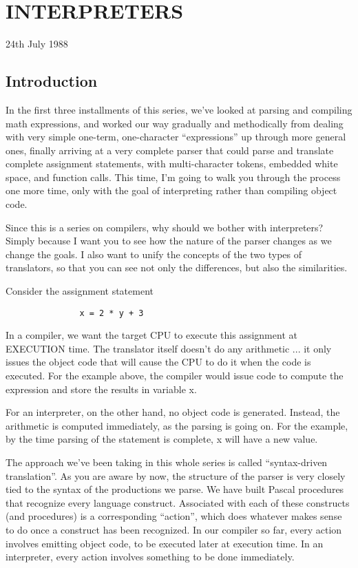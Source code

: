 
\chapter{INTERPRETERS}

24th July 1988

\section{Introduction}

In the first three installments of this series, we've  looked at parsing and  compiling math expressions, and worked our way gradually and methodically from dealing  with  very  simple one-term, one-character ``expressions'' up through more general ones, finally arriving at a very complete parser that could parse and translate complete  assignment  statements, with  multi-character  tokens, embedded white space, and function calls. This  time, I'm going to walk you through the process one more time, only with the goal of interpreting rather than compiling object code.

Since this is a series on compilers, why should  we  bother  with interpreters?  Simply because I want you to see how the nature of the  parser changes as we change the goals. I also want to unify the concepts of the two types of translators, so that you can see not only the differences, but also the similarities.

Consider the assignment statement

\begin{verbatim}
               x = 2 * y + 3
\end{verbatim}

In a compiler, we want the target CPU to execute  this assignment at EXECUTION time. The translator itself doesn't  do  any arithmetic ... it only issues the object code that will cause  the CPU to do it when the code is executed. For  the  example above, the compiler would issue code to compute the expression and store the results in variable x.

For an interpreter, on  the  other  hand, no object code is generated. Instead, the arithmetic is computed immediately, as the parsing is going on. For the example, by the time parsing of the statement is complete, x will have a new value.

The approach we've been  taking  in  this  whole series is called ``syntax-driven translation''.  As you are aware by now, the structure of the  parser  is  very  closely  tied to the syntax of the productions we parse. We  have built Pascal procedures that recognize every language  construct. Associated with each of these constructs (and procedures) is  a  corresponding  ``action'', which does  whatever  makes  sense to do  once  a  construct  has  been recognized. In  our  compiler  so far, every  action  involves emitting object code, to be executed later at execution time. In an interpreter, every action  involves  something  to be done immediately.

